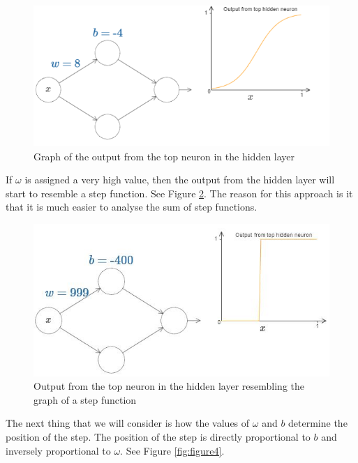 \documentclass{article}
\begin{document}
\begin{figure}[H]
    \centering
    \includegraphics[width=0.8 \textwidth]{Images/2/1.png}
    \caption{Graph of the output from the top neuron in the hidden layer}
    \label{fig:figure2}
\end{figure}

If $\omega$ is assigned a very high value, then the output from the hidden layer will start to resemble a step function. See  Figure \ref{fig:figure3}. The reason for this approach is it that it is much easier to analyse the sum of step functions.

\begin{figure}[h!]
    \centering
    \includegraphics[width=0.8 \textwidth]{Images/2/2.png}
    \caption{Output from the top neuron in the hidden layer resembling the graph of a step function}
    \label{fig:figure3}
\end{figure}
The next thing that we will consider is how the values of $\omega$ and $b$ determine the position of the step. The position of the step is directly proportional to $b$ and inversely proportional to $\omega$. See Figure \ref{fig:figure4}.
\end{document}
